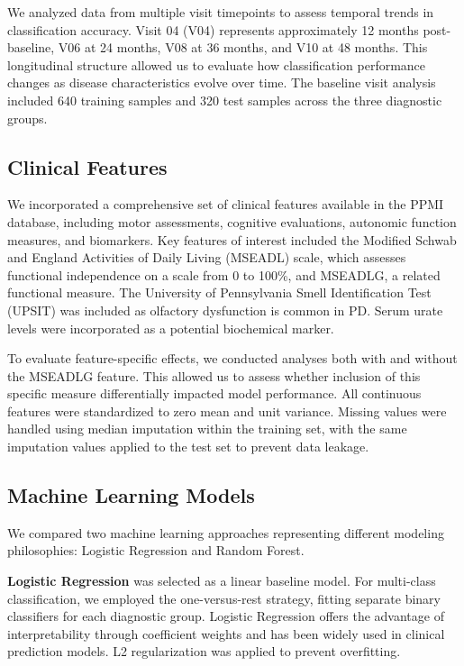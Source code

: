 \documentclass[12pt,a4paper]{article}
\begin{document}
We analyzed data from multiple visit timepoints to assess temporal trends in classification accuracy. Visit 04 (V04) represents approximately 12 months post-baseline, V06 at 24 months, V08 at 36 months, and V10 at 48 months. This longitudinal structure allowed us to evaluate how classification performance changes as disease characteristics evolve over time. The baseline visit analysis included 640 training samples and 320 test samples across the three diagnostic groups.

\subsection{Clinical Features}

We incorporated a comprehensive set of clinical features available in the PPMI database, including motor assessments, cognitive evaluations, autonomic function measures, and biomarkers. Key features of interest included the Modified Schwab and England Activities of Daily Living (MSEADL) scale, which assesses functional independence on a scale from 0 to 100\%, and MSEADLG, a related functional measure. The University of Pennsylvania Smell Identification Test (UPSIT) was included as olfactory dysfunction is common in PD. Serum urate levels were incorporated as a potential biochemical marker.

To evaluate feature-specific effects, we conducted analyses both with and without the MSEADLG feature. This allowed us to assess whether inclusion of this specific measure differentially impacted model performance. All continuous features were standardized to zero mean and unit variance. Missing values were handled using median imputation within the training set, with the same imputation values applied to the test set to prevent data leakage.

\subsection{Machine Learning Models}

We compared two machine learning approaches representing different modeling philosophies: Logistic Regression and Random Forest.

\textbf{Logistic Regression} was selected as a linear baseline model. For multi-class classification, we employed the one-versus-rest strategy, fitting separate binary classifiers for each diagnostic group. Logistic Regression offers the advantage of interpretability through coefficient weights and has been widely used in clinical prediction models. L2 regularization was applied to prevent overfitting.
\end{document}
